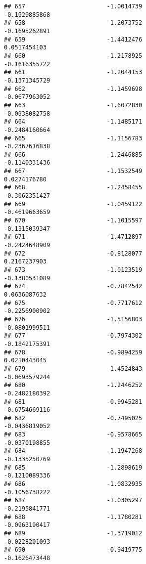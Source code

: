 \documentclass[
]{article}
\begin{document}
\begin{verbatim}
## 657                       -1.0014739                         -0.1929885868
## 658                       -1.2073752                         -0.1695262891
## 659                       -1.4412476                          0.0517454103
## 660                       -1.2178925                         -0.1616355722
## 661                       -1.2044153                         -0.1371345729
## 662                       -1.1459698                         -0.0677963052
## 663                       -1.6072830                         -0.0938082758
## 664                       -1.1485171                         -0.2484160664
## 665                       -1.1156783                         -0.2367616838
## 666                       -1.2446885                         -0.1140331436
## 667                       -1.1532549                          0.0274176780
## 668                       -1.2458455                         -0.3062351427
## 669                       -1.0459122                         -0.4619663659
## 670                       -1.1015597                         -0.1315039347
## 671                       -1.4712897                         -0.2424648909
## 672                       -0.8128077                          0.2167237903
## 673                       -1.0123519                         -0.1380531089
## 674                       -0.7842542                          0.0636087632
## 675                       -0.7717612                         -0.2256900902
## 676                       -1.5156803                         -0.0801999511
## 677                       -0.7974302                         -0.1842175391
## 678                       -0.9894259                          0.0210443045
## 679                       -1.4524843                         -0.0693579244
## 680                       -1.2446252                         -0.2482180392
## 681                       -0.9945281                         -0.6754669116
## 682                       -0.7495025                         -0.0436819052
## 683                       -0.9578665                         -0.0370198855
## 684                       -1.1947268                         -0.1335250769
## 685                       -1.2898619                         -0.1210089336
## 686                       -1.0832935                         -0.1056738222
## 687                       -1.0305297                         -0.2195841771
## 688                       -1.1780281                         -0.0963190417
## 689                       -1.3719012                         -0.0228201093
## 690                       -0.9419775                         -0.1626473448

\end{verbatim}
\end{document}
